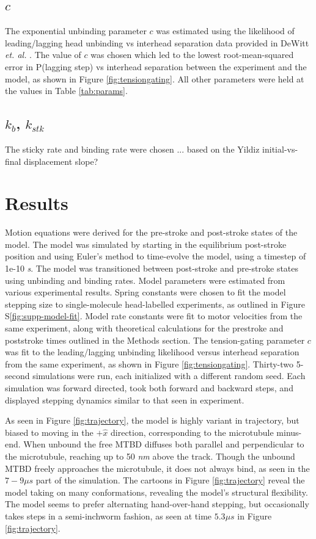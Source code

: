 \documentclass[9pt,twocolumn,twoside]{article}
\begin{document}
\subsection*{$c$}
The exponential unbinding parameter $c$ was estimated using the likelihood of leading/lagging head unbinding vs interhead separation data provided in DeWitt \textit{et. al.} \cite{dewitt}. The value of $c$ was chosen which led to the lowest root-mean-squared error in P(lagging step) vs interhead separation between the experiment and the model, as shown in Figure \ref{fig:tensiongating}. All other parameters were held at the values in Table \ref{tab:params}.

\subsection*{$k_b$, $k_{stk}$}
The sticky rate and binding rate were chosen ... based on the Yildiz initial-vs-final displacement slope?


\section{Results}

Motion equations were derived for the pre-stroke and post-stroke states of the model. The model was simulated by starting in the equilibrium post-stroke position and using Euler's method to time-evolve the model, using a timestep of 1e-10 \textit{s}. The model was transitioned between post-stroke and pre-stroke states using unbinding and binding rates. Model parameters were estimated from various experimental results. Spring constants were chosen to fit the model stepping size to single-molecule head-labelled experiments\cite{yildizpaper}, as outlined in Figure S\ref{fig:supp-model-fit}. Model rate constants were fit to motor velocities from the same experiment, along with theoretical calculations for the prestroke and poststroke times outlined in the Methods section. The tension-gating parameter $c$ was fit to the leading/lagging unbinding likelihood versus interhead separation from the same experiment, as shown in Figure \ref{fig:tensiongating}. Thirty-two 5-second simulations were run, each initialized with a different random seed. Each simulation was forward directed, took both forward and backward steps, and displayed stepping dynamics similar to that seen in experiment.

As seen in Figure \ref{fig:trajectory}, the model is highly variant in trajectory, but biased to moving in the $+\hat{x}$ direction, corresponding to the microtubule minus-end. When unbound the free MTBD diffuses both parallel and perpendicular to the microtubule, reaching up to 50 \textit{nm} above the track. Though the unbound MTBD freely approaches the microtubule, it does not always bind, as seen in the $7-9 \mu s$ part of the simulation. The cartoons in Figure \ref{fig:trajectory} reveal the model taking on many conformations, revealing the model's structural flexibility. The model seems to prefer alternating hand-over-hand stepping, but occasionally takes steps in a semi-inchworm fashion, as seen at time $5.3 \mu s$ in Figure \ref{fig:trajectory}.
\end{document}

